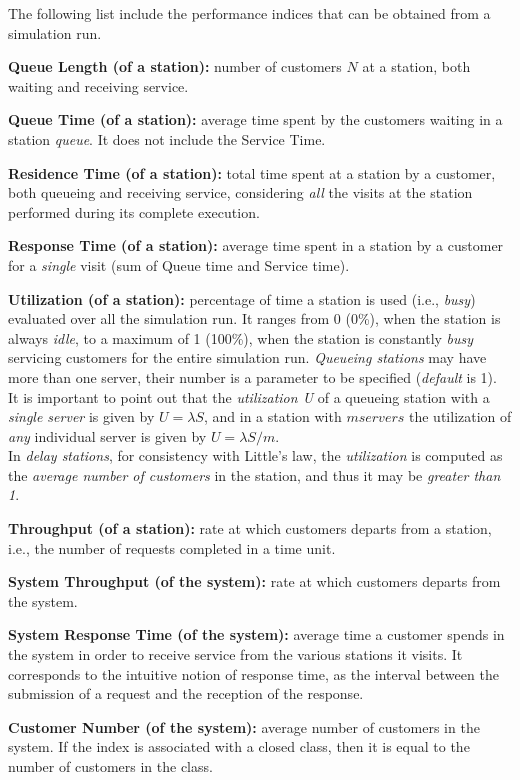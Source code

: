 The following list include the performance indices that can be obtained from
a simulation run.
\begin{itemize*}
\item \textbf{Queue Length (of a station):} number of customers $N$ at a
station, both waiting and receiving service.

\item \textbf{Queue Time (of a station):} average time spent by the
customers waiting in a station \emph{queue}. It does not include the
Service Time.

\item \textbf{Residence Time (of a station):} total time spent at a
station by a customer, both queueing and receiving service,
considering \emph{all} the visits at the station performed during its complete execution.

\item \textbf{Response Time (of a station):} average time spent in a
station by a customer for a \emph{single} visit (sum of Queue time and
Service time).

\item \textbf{Utilization (of a station):} percentage of time a
station is used (i.e., \emph{busy}) evaluated over all the
simulation run. It ranges from 0 (0\%), when the station is always
\emph{idle}, to a maximum of 1 (100\%), when the station is
constantly \emph{busy} servicing customers for the entire
simulation run. \emph{Queueing stations} may have more than one
server, their number is a parameter to be specified
(\emph{default} is 1). It is important to point out that the
\emph{utilization U} of a queueing station with a \emph{single
server} is given by $U=\lambda S$, and in a station with $m
servers$ the utilization of \emph{any} individual server
is given by $U=\lambda S /m$.\\
In \emph{delay stations}, for consistency with Little's law, the
\emph{utilization} is computed as the \emph{average number of
customers} in the station, and thus it may be \emph{greater than
1}.

\item \textbf{Throughput (of a station):} rate at which customers
departs from a station, i.e., the number of requests completed in
a time unit.

\item \textbf{System Throughput (of the system):} rate at which customers departs
from the system.

\item \textbf{System Response Time (of the system):} average time a customer
spends in the system in order to receive service from the various
stations it visits. It corresponds to the intuitive notion of
response time, as the interval between the submission of a request
and the reception of the response.

\item \textbf{Customer Number (of the system):} average number of
customers in the system. If the index is associated with a closed
class, then it is equal to the number of customers in the class.
\end{itemize*}
